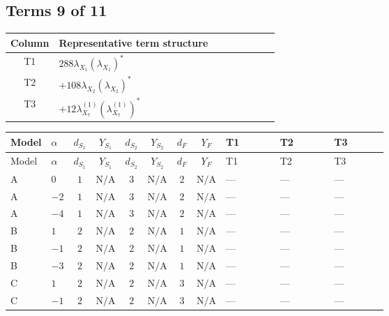 \documentclass[8pt]{article}
\begin{document}
\begin{landscape}
\subsection*{Terms 9 of 11}
\begin{center}
\begin{tabular}{@{}c >{\raggedright\arraybackslash}p{0.82\linewidth}@{}}
\toprule
Column & Representative term structure \\
\midrule
T1 & \(\displaystyle 288 {\lambda_{X_{1}}} \left({\lambda_{X_{1}}}\right)^{*}\) \\
\midrule
T2 & \(\displaystyle +108 {\lambda_{X_{2}}} \left({\lambda_{X_{2}}}\right)^{*}\) \\
\midrule
T3 & \(\displaystyle +12 {\lambda_{X_{7}}^{(1)}} \left({\lambda_{X_{7}}^{(1)}}\right)^{*}\) \\
\midrule
\bottomrule
\end{tabular}
\end{center}
\smallskip
\tiny
\begin{longtable}{@{}llcccccc >{\raggedright\arraybackslash}p{0.21\linewidth} >{\raggedright\arraybackslash}p{0.21\linewidth} >{\raggedright\arraybackslash}p{0.21\linewidth}@{}}
\toprule
Model & $\alpha$ & $d_{S_1}$ & $Y_{S_1}$ & $d_{S_2}$ & $Y_{S_2}$ & $d_F$ & $Y_F$ & T1 & T2 & T3 \\
\midrule
\endfirsthead
\toprule
Model & $\alpha$ & $d_{S_1}$ & $Y_{S_1}$ & $d_{S_2}$ & $Y_{S_2}$ & $d_F$ & $Y_F$ & T1 & T2 & T3 \\
\midrule
\endhead
A & $0$ & $1$ & $\text{N/A}$ & $3$ & $\text{N/A}$ & $2$ & $\text{N/A}$ & --- & --- & --- \\
\midrule
A & $-2$ & $1$ & $\text{N/A}$ & $3$ & $\text{N/A}$ & $2$ & $\text{N/A}$ & --- & --- & --- \\
\midrule
A & $-4$ & $1$ & $\text{N/A}$ & $3$ & $\text{N/A}$ & $2$ & $\text{N/A}$ & --- & --- & --- \\
\midrule
B & $1$ & $2$ & $\text{N/A}$ & $2$ & $\text{N/A}$ & $1$ & $\text{N/A}$ & --- & --- & --- \\
\midrule
B & $-1$ & $2$ & $\text{N/A}$ & $2$ & $\text{N/A}$ & $1$ & $\text{N/A}$ & --- & --- & --- \\
\midrule
B & $-3$ & $2$ & $\text{N/A}$ & $2$ & $\text{N/A}$ & $1$ & $\text{N/A}$ & --- & --- & --- \\
\midrule
C & $1$ & $2$ & $\text{N/A}$ & $2$ & $\text{N/A}$ & $3$ & $\text{N/A}$ & --- & --- & --- \\
\midrule
C & $-1$ & $2$ & $\text{N/A}$ & $2$ & $\text{N/A}$ & $3$ & $\text{N/A}$ & --- & --- & --- \\

\end{longtable}
\end{landscape}
\end{document}
